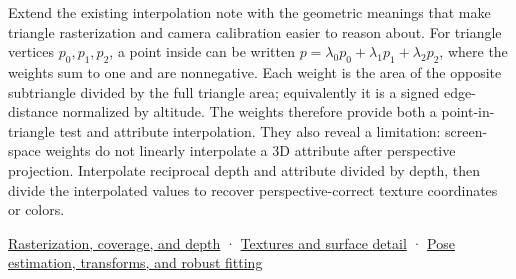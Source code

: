 Extend the existing interpolation note with the geometric meanings that make triangle rasterization and camera calibration easier to reason about. For triangle vertices \(p_0,p_1,p_2\), a point inside can be written \(p=\lambda_0p_0+\lambda_1p_1+\lambda_2p_2\), where the weights sum to one and are nonnegative. Each weight is the area of the opposite subtriangle divided by the full triangle area; equivalently it is a signed edge-distance normalized by altitude. The weights therefore provide both a point-in-triangle test and attribute interpolation. They also reveal a limitation: screen-space weights do not linearly interpolate a 3D attribute after perspective projection. Interpolate reciprocal depth and attribute divided by depth, then divide the interpolated values to recover perspective-correct texture coordinates or colors.

\href{Continuous\%20Notes/University\%20-\%20Worlds,\%20Images\%20and\%20Inference\%20-\%20Graphics,\%20Vision\%20and\%20Photography\#Rasterization,\%20coverage,\%20and\%20depth}{Rasterization, coverage, and depth} · \href{Continuous\%20Notes/University\%20-\%20Worlds,\%20Images\%20and\%20Inference\%20-\%20Graphics,\%20Vision\%20and\%20Photography\#Textures\%20and\%20surface\%20detail}{Textures and surface detail} · \href{Continuous\%20Notes/University\%20-\%20Worlds,\%20Images\%20and\%20Inference\%20-\%20Graphics,\%20Vision\%20and\%20Photography\#Pose\%20estimation,\%20transforms,\%20and\%20robust\%20fitting}{Pose estimation, transforms, and robust fitting}
